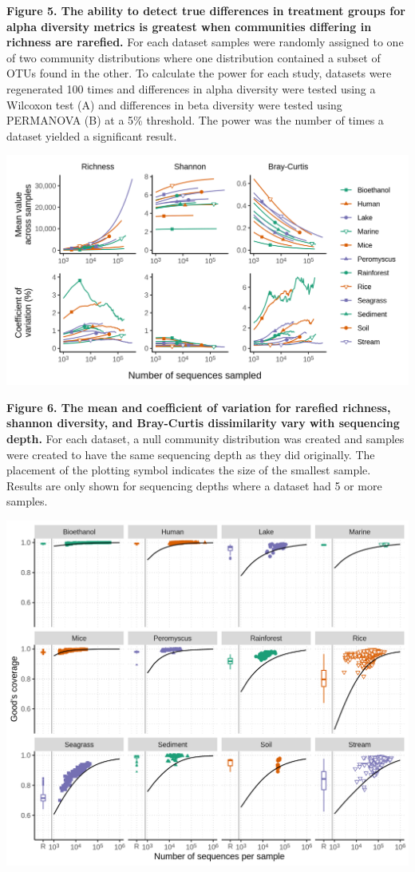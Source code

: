 \documentclass[
]{article}
\begin{document}
\textbf{Figure 5. The ability to detect true differences in treatment
groups for alpha diversity metrics is greatest when communities
differing in richness are rarefied.} For each dataset samples were
randomly assigned to one of two community distributions where one
distribution contained a subset of OTUs found in the other. To calculate
the power for each study, datasets were regenerated 100 times and
differences in alpha diversity were tested using a Wilcoxon test (A) and
differences in beta diversity were tested using PERMANOVA (B) at a 5\%
threshold. The power was the number of times a dataset yielded a
significant result.

\newpage

\includegraphics{figure_6.png}

\textbf{Figure 6. The mean and coefficient of variation for rarefied
richness, shannon diversity, and Bray-Curtis dissimilarity vary with
sequencing depth.} For each dataset, a null community distribution was
created and samples were created to have the same sequencing depth as
they did originally. The placement of the plotting symbol indicates the
size of the smallest sample. Results are only shown for sequencing
depths where a dataset had 5 or more samples.

\newpage

\includegraphics{figure_7.png}
\end{document}
